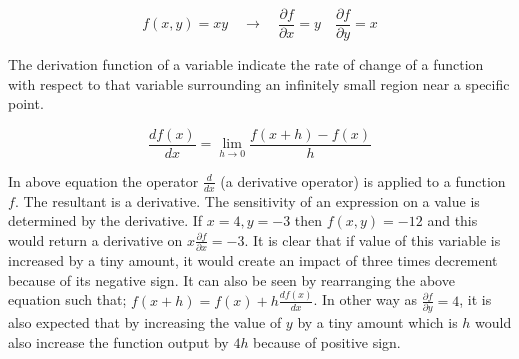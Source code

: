 \documentclass[11pt]{article}
\begin{document}
\begin{equation}
f(x, y)=x y \quad \rightarrow \quad \frac{\partial f}{\partial x}=y \quad \frac{\partial f}{\partial y}=x
\end{equation}

The derivation function of a variable indicate the rate of change of a function with respect to that variable surrounding an infinitely small region near a specific point.

\begin{equation}
\frac{d f(x)}{d x}=\lim _{h \rightarrow 0} \frac{f(x+h)-f(x)}{h}
\end{equation}

In above equation the operator $ \frac{d}{d x} $ (a derivative operator) is applied to a function $f$. The resultant is a derivative. The sensitivity of an expression on a value is determined by the derivative. If $x=4, y=-3$ then $f(x, y)=-12$ and this would return a derivative on $x \frac{\partial f}{\partial x}=-3$. It is clear that if value of this variable is increased by a tiny amount, it would create an impact of three times decrement because of its negative sign. It can also be seen by rearranging the above equation such that; $f(x+h)=f(x)+h \frac{d f(x)}{d x}$. In other way as $\frac{\partial f}{\partial y}=4$, it is also expected that by increasing the value of $y$ by a tiny amount which is $h$ would also increase the function output by $4h$ because of positive sign.
\end{document}
